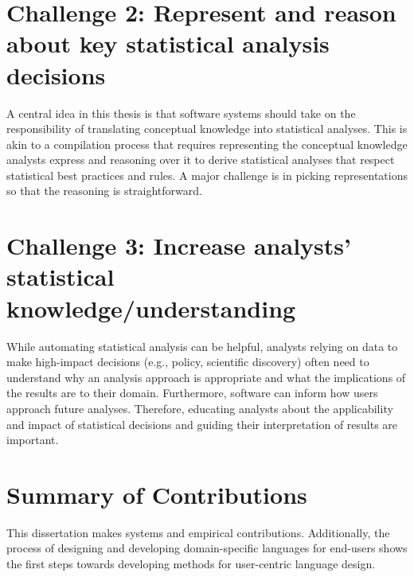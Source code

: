 


\section*{Challenge 2: Represent and reason about key statistical analysis decisions} %
A central idea in this thesis is that software systems should take on the
responsibility of translating conceptual knowledge into statistical analyses.
This is akin to a compilation process that requires representing the conceptual
knowledge analysts express and reasoning over it to derive statistical
analyses that respect statistical best practices and rules. A
major challenge is in picking representations so that the reasoning is straightforward. 

\section*{Challenge 3: Increase analysts' statistical knowledge/understanding} %
While automating statistical analysis can be helpful, analysts relying on data
to make high-impact decisions (e.g., policy, scientific discovery) often need to
understand why an analysis approach is appropriate and what the implications of
the results are to their domain. Furthermore, software can inform how users
approach future analyses. Therefore, educating analysts about the applicability
and impact of statistical decisions and guiding their interpretation of results
are important.

\section*{Summary of Contributions}
This dissertation makes systems and empirical contributions. Additionally, the
process of designing and developing domain-specific languages for end-users
shows the first steps towards developing methods for user-centric language
design. 

